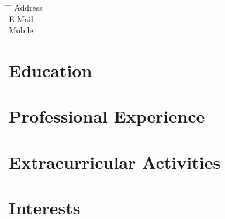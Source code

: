 \documentclass[12pt]{report} %
\begin{document}




\begin{tabbing}
\hspace{3cm} \= \hspace{4cm} \= \kill %
{Address} \> \varAddress\\
{E-Mail}  \> \href{mailto:\varEmail}{\varEmail} \\
{Mobile}  \> \varMobile \\
\end{tabbing}



\section{Education}

\education{}
\begin{list}{}%
         {\setlength{\leftmargin}{0.19\linewidth}}%
         \item[]%
{\small{\color{gray}\varEducationInfo{}}}
\end{list}


\section{Professional Experience}

\professional{}


\section{Extracurricular Activities}

\extracurricular{}



\section{Interests}

\interests{}


\end{document}
